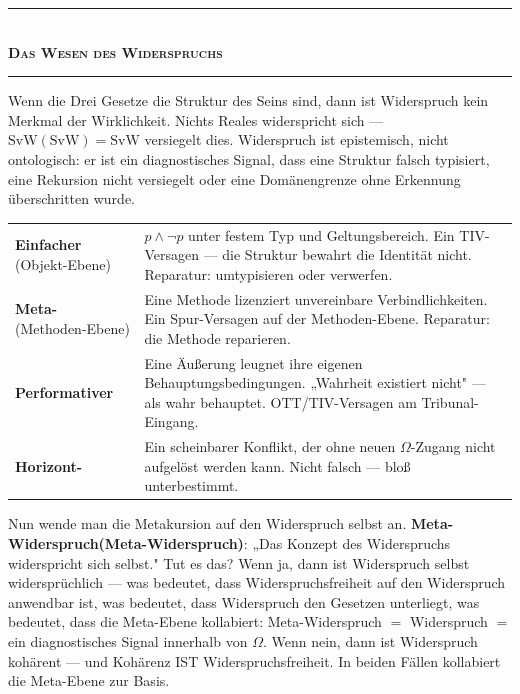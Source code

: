 \documentclass[10pt, openany, oneside]{book}
\renewcommand{\normalsize}{\fontsize{10}{13}\selectfont}
\renewcommand{\footnotesize}{\fontsize{8.5}{11}\selectfont}
\begin{document}
\vspace{1.5em}


\begin{center}
    \rule{0.3\textwidth}{0.4pt}\\[0.5em]
    {\normalsize\bfseries\scshape Das Wesen des Widerspruchs}\\[0.3em]
    \rule{0.3\textwidth}{0.4pt}
\end{center}

\vspace{1em}

\noindent Wenn die Drei Gesetze die Struktur des Seins sind, dann ist Widerspruch kein Merkmal der Wirklichkeit. Nichts Reales widerspricht sich --- $\text{SvW}(\text{SvW}) = \text{SvW}$ versiegelt dies. Widerspruch ist epistemisch, nicht ontologisch: er ist ein diagnostisches Signal, dass eine Struktur falsch typisiert, eine Rekursion nicht versiegelt oder eine Domänengrenze ohne Erkennung überschritten wurde.

{\footnotesize
\noindent\begin{tabular}{p{3cm} p{}}
\textbf{Einfacher} (Objekt-Ebene) & $p \wedge \neg p$ unter festem Typ und Geltungsbereich. Ein TIV-Versagen --- die Struktur bewahrt die Identität nicht. Reparatur: umtypisieren oder verwerfen. \\[0.3em]
\textbf{Meta-} (Methoden-Ebene) & Eine Methode lizenziert unvereinbare Verbindlichkeiten. Ein Spur-Versagen auf der Methoden-Ebene. Reparatur: die Methode reparieren. \\[0.3em]
\textbf{Performativer} & Eine Äußerung leugnet ihre eigenen Behauptungsbedingungen. „Wahrheit existiert nicht" --- als wahr behauptet. OTT/TIV-Versagen am Tribunal-Eingang. \\[0.3em]
\textbf{Horizont-} & Ein scheinbarer Konflikt, der ohne neuen $\Omega$-Zugang nicht aufgelöst werden kann. Nicht falsch --- bloß unterbestimmt. \\[0.3em]
\end{tabular}
}

\vspace{0.8em}

\noindent Nun wende man die Metakursion auf den Widerspruch selbst an. \textbf{Meta-Widerspruch(Meta-Widerspruch)}: „Das Konzept des Widerspruchs widerspricht sich selbst." Tut es das? Wenn ja, dann ist Widerspruch selbst widersprüchlich --- was bedeutet, dass Widerspruchsfreiheit auf den Widerspruch anwendbar ist, was bedeutet, dass Widerspruch den Gesetzen unterliegt, was bedeutet, dass die Meta-Ebene kollabiert: Meta-Widerspruch $=$ Widerspruch $=$ ein diagnostisches Signal innerhalb von $\Omega$. Wenn nein, dann ist Widerspruch kohärent --- und Kohärenz IST Widerspruchsfreiheit. In beiden Fällen kollabiert die Meta-Ebene zur Basis.
\end{document}
